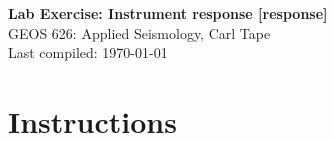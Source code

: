 \documentclass[11pt,titlepage,fleqn]{article}
\begin{document}

\begin{spacing}{1.2}
\centering
{\large \bf Lab Exercise: Instrument response [response]} \\
GEOS 626: Applied Seismology, Carl Tape \\
Last compiled: \today
\end{spacing}


\section{Instructions}
\end{document}
